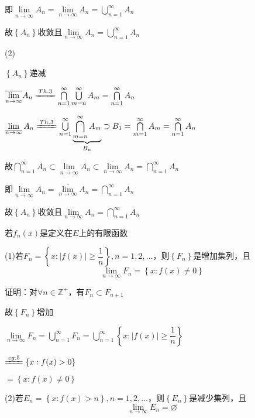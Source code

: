 \par 即$\lim \limits_{\overline{n \to \infty}}A_{n} = \overline{\lim \limits_{n \to \infty}}A_{n} = \bigcup \limits_{n=1}^{\infty}A_{n}$
\par 故$\left\{A_{n}\right\}$收敛且$\lim \limits_{n \to \infty} A_{n} = \bigcup \limits_{n=1}^{\infty}A_{n}$
\par (2)
\par $\left\{A_{n}\right\}$递减
\par $\overline{\lim \limits_{n \to \infty}}A_{n} \xlongequal{Th.3}\bigcap \limits_{n=1}^{\infty}\bigcup \limits_{m=n}^{\infty}A_{m} = \bigcap \limits_{n=1}^{\infty}A_{n}$
\par $\lim \limits_{\overline{n \to \infty}}A_{n} \xlongequal{Th.3}\bigcup \limits_{n=1}^{\infty}\underbrace{\bigcap \limits_{m=n}^{\infty}A_{m}}_\text{$B_{n}$} \supset  B_{1} = \bigcap \limits_{m=1}^{\infty}A_{m} = \bigcap \limits_{n=1}^{\infty}A_{n}$
\par 故$\bigcap \limits_{n=1}^{\infty}A_{n} \subset \lim \limits_{\overline{n \to \infty}}A_{n} \subset \overline{\lim \limits_{n \to \infty}}A_{n} = \bigcap \limits_{n=1}^{\infty}A_{n}$
\par 即$\lim \limits_{\overline{n \to \infty}}A_{n} = \overline{\lim \limits_{n \to \infty}}A_{n} = \bigcap \limits_{n=1}^{\infty}A_{n}$
\par 故$\left\{A_{n}\right\}$收敛且$\lim \limits_{n \to \infty} A_{n} = \bigcap \limits_{n=1}^{\infty}A_{n}$
\begin{eg}
若$f_{n}(x)$是定义在$E$上的有限函数
\par (1)若$F_{n} = \left\{x : \left\lvert f(x)\right\rvert \geqslant \dfrac{1}{n}\right\} ,n=1,2,\dots$，则$\left\{F_{n}\right\}$是增加集列，且
\[\lim \limits_{n \to \infty} F_{n} = \left\{x : f(x)\neq 0\right\}\]    
\end{eg}
\noindent 证明：对$\forall n \in \mathbb{Z}^{+}$，有$F_{n}\subset F_{n+1}$
\par \quad 故$\left\{F_{n}\right\}$增加
\par \quad $\lim \limits_{n \to \infty} F_{n} = \bigcup \limits_{n=1}^{\infty}F_{n} = \bigcup \limits_{n=1}^{\infty}\left\{x : \left\lvert f(x)\right\rvert \geqslant \dfrac{1}{n}\right\}$
\par \quad $\xlongequal{eg.5}\left\{x : f(x) > 0\right\}$
\par \quad $= \left\{x : f(x)\neq 0\right\}$
\begin{eg}
\par (2)若$E_{n} = \left\{x : f(x) > n\right\} ,n=1,2,\dots$，则$\left\{E_{n}\right\}$是减少集列，且
\[\lim \limits_{n \to \infty} E_{n} = \varnothing \]    
\end{eg}
